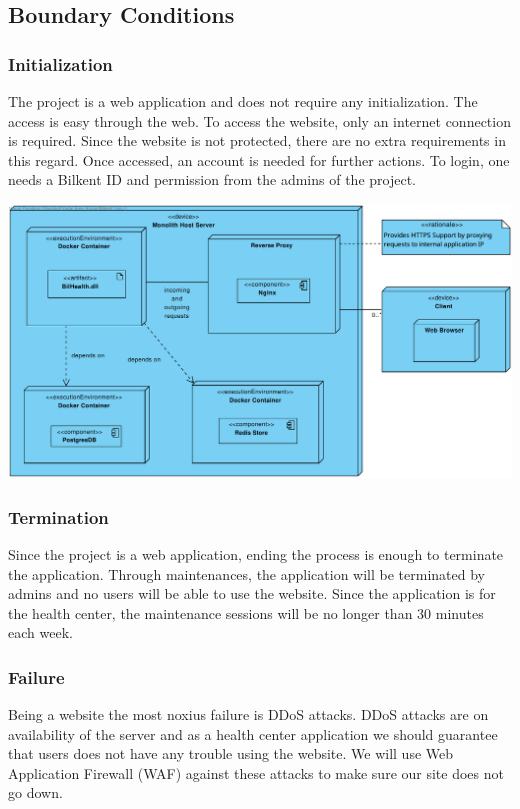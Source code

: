 \documentclass[a4paper, 12pt, titlepage]{article}
\begin{document}
  \subsection{Boundary Conditions}

  \subsubsection{Initialization}

  The project is a web application and does not require any initialization.
  The access is easy through the web.
  To access the website, only an internet connection is required.
  Since the website is not protected, there are no extra requirements in this regard.
  Once accessed, an account is needed for further actions.
  To login, one needs a Bilkent ID and permission from the admins of the project.

  \includegraphics[width=\linewidth]{deploy_diag.pdf}

  \subsubsection{Termination}

  Since the project is a web application, ending the process is enough to terminate the application.
  Through maintenances, the application will be terminated by admins and no users will be able to use the website.
  Since the application is for the health center, the maintenance sessions will be no longer than 30 minutes each week.

  \subsubsection{Failure}

  Being a website the most noxius failure is DDoS attacks.
  DDoS attacks are on availability of the server and as a health center application we should guarantee that users does not have
  any trouble using the website.
  We will use Web Application Firewall (WAF) against these attacks to make sure our site does not go down.
\end{document}

